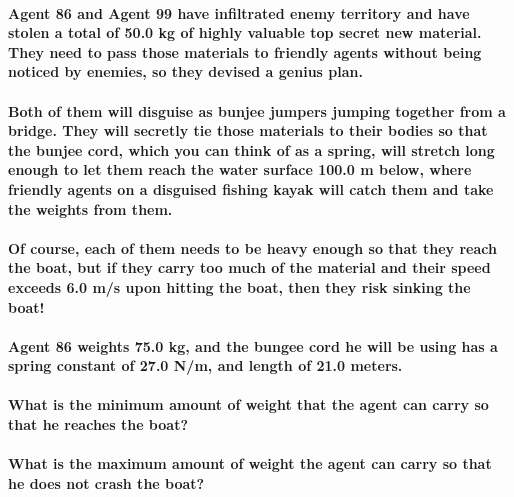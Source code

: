 \paragraph{Agent 86 and Agent 99 have infiltrated enemy territory and have stolen a total of 50.0 kg of highly valuable top secret new material. They need to pass those materials to friendly agents without being noticed by enemies, so they devised a genius plan.\newline}
\paragraph{Both of them will disguise as bunjee jumpers jumping together from a bridge. They will secretly tie those materials to their bodies so that the bunjee cord, which you can think of as a spring, will stretch long enough to let them reach the water surface 100.0 m below, where friendly agents on a disguised fishing kayak will catch them and take the weights from them.\newline}
\paragraph{Of course, each of them needs to be heavy enough so that they reach the boat, but if they carry too much of the material and their speed exceeds 6.0 m/s upon hitting the boat, then they risk sinking the boat!\newline}
\paragraph{Agent 86 weights 75.0 kg, and the bungee cord he will be using has a spring constant of 27.0 N/m, and length of 21.0 meters.\newline}
\paragraph{What is the minimum amount of weight that the agent can carry so that he reaches the boat? \newline}
\paragraph{What is the maximum amount of weight the agent can carry so that he does not crash the boat?\newline}

